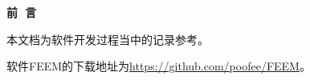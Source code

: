 \newpage

\vspace{9em}

{\songti \yihao \textbf{前\,\,\,\,言}}

\vspace{8em}


本文档为软件开发过程当中的记录参考。

软件FEEM的下载地址为\url{https://github.com/poofee/FEEM}。

